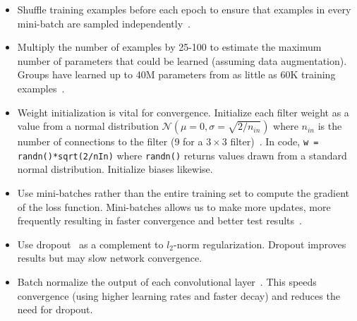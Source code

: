 \begin{itemize}

	\item Shuffle training examples before each epoch to ensure that examples in every mini-batch are sampled independently~\cite{Bengio2012}.

	\item Multiply the number of examples by 25-100 to estimate the maximum number of parameters that could be learned (assuming data augmentation). Groups have learned up to 40M parameters from as little as 60K training examples~\cite{Dieleman2015, Springenberg2014}.

	\item Weight initialization is vital for convergence. Initialize each filter weight as a value from a normal distribution $\mathcal{N}(\mu = 0, \sigma = \sqrt{2/n_{in}})$ where $n_{in}$ is the number of connections to the filter (9 for a $3\times 3$ filter)~\cite{He2015a}. In code, \texttt{w = randn()*sqrt(2/nIn)} where \texttt{randn()} returns values drawn from a standard normal distribution. Initialize biases likewise.

	\item Use mini-batches rather than the entire training set to compute the gradient of the loss function. Mini-batches allows us to make more updates, more frequently resulting in faster convergence and better test results~\cite{Bengio2012}.

	\item Use dropout~\cite{Krizhevsky2012} as a complement to $l_2$-norm regularization. Dropout improves results but may slow network convergence.

	\item Batch normalize the output of each convolutional layer~\cite{Ioffe2015}. This speeds convergence (using higher learning rates and faster decay) and reduces the need for dropout. %


\end{itemize}
